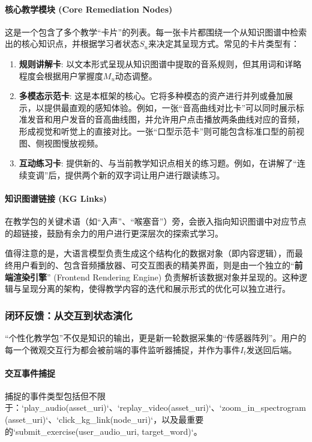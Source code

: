 \paragraph{核心教学模块 (Core Remediation Nodes)}
这是一个包含了多个教学“卡片”的列表。每一张卡片都围绕一个从知识图谱中检索出的核心知识点，并根据学习者状态$S_u$来决定其呈现方式。常见的卡片类型有：
\begin{enumerate}
    \item \textbf{规则讲解卡}: 以文本形式呈现从知识图谱中提取的音系规则，但其用词和详略程度会根据用户掌握度$M_u$动态调整。
    \item \textbf{多模态示范卡}: 这是本框架的核心。它将多种模态的资产进行并列或叠加展示，以提供最直观的感知体验。例如，一张“音高曲线对比卡”可以同时展示标准发音和用户发音的音高曲线图，并允许用户点击播放两条曲线对应的音频，形成视觉和听觉上的直接对比。一张“口型示范卡”则可能包含标准口型的前视图、侧视图慢放视频。
    \item \textbf{互动练习卡}: 提供新的、与当前教学知识点相关的练习题。例如，在讲解了“连续变调”后，提供两个新的双字词让用户进行跟读练习。
\end{enumerate}

\paragraph{知识图谱链接 (KG Links)}
在教学包的关键术语（如“入声”、“喉塞音”）旁，会嵌入指向知识图谱中对应节点的超链接，鼓励有余力的用户进行更深层次的探索式学习。

值得注意的是，大语言模型负责生成这个结构化的数据对象（即内容逻辑），而最终用户看到的、包含音频播放器、可交互图表的精美界面，则是由一个独立的“\textbf{前端渲染引擎}” (Frontend Rendering Engine) 负责解析该数据对象并呈现的。这种逻辑与呈现分离的架构，使得教学内容的迭代和展示形式的优化可以独立进行。

\subsubsection*{闭环反馈：从交互到状态演化}
“个性化教学包”不仅是知识的输出，更是新一轮数据采集的“传感器阵列”。用户的每一个微观交互行为都会被前端的事件监听器捕捉，并作为事件$I_t$发送回后端。

\paragraph{交互事件捕捉}
捕捉的事件类型包括但不限于：`play\_audio(asset\_uri)`、`replay\_video(asset\_uri)`、`zoom\_in\_spectrogram(asset\_uri)`、`click\_kg\_link(node\_uri)`，以及最重要的`submit\_exercise(user\_audio\_uri, target\_word)`。

